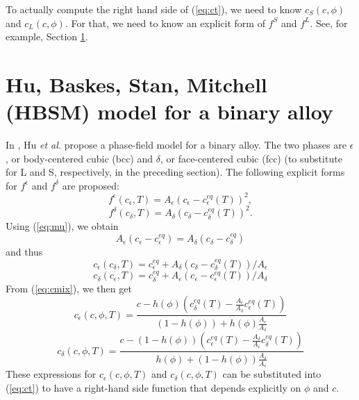 To actually compute the right hand side of (\ref{eq:ct}), we need to
know $c_S(c,\phi)$ and $c_L(c,\phi)$. For that, we need to know an
explicit form of $f^S$ and $f^L$. See, for example, Section
\ref{sec:hbsm}.

%
\section{Hu, Baskes, Stan, Mitchell (HBSM) model for a binary alloy}
\label{sec:hbsm}

In \cite{HuBaskesStanMitchell07}, Hu {\em et al.} propose a phase-field
model for a binary alloy.  The two phases are $\epsilon$, or body-centered cubic (bcc) and $\delta$, or face-centered cubic (fcc) (to
substitute for L and S, respectively, in the preceding section).  The following explicit
forms for $f^\epsilon$ and $f^\delta$ are proposed:
%
\begin{equation}
  f^\epsilon(c_\epsilon,T)=A_\epsilon\left(c_\epsilon-c_\epsilon^{eq}(T)\right)^2,
\label{eq:fepsilon}
\end{equation}
%
\begin{equation}
  f^\delta(c_\delta,T)=A_\delta\left(c_\delta-c_\delta^{eq}(T)\right)^2.
\label{eq:fdelta}
\end{equation}
%
Using (\ref{eq:mu}), we obtain
%
\begin{equation}
  A_\epsilon(c_\epsilon-c_\epsilon^{eq})=A_\delta(c_\delta-c_\delta^{eq})
\end{equation}
%
and thus
%
\begin{equation}
  c_\epsilon(c_\delta,T) =
  c_\epsilon^{eq}+A_\delta(c_\delta-c_\delta^{eq}(T))/A_\epsilon
\end{equation}
%
\begin{equation}
  c_\delta(c_\epsilon,T) =
  c_\delta^{eq}+A_\epsilon(c_\epsilon-c_\epsilon^{eq}(T))/A_\delta
\end{equation}
%
From (\ref{eq:cmix}), we then get
%
\begin{equation}
  c_\epsilon(c,\phi,T) =
  \frac{c-h(\phi)\left(c_\delta^{eq}(T)-\frac{A_\epsilon}{A_\delta}c_\epsilon^{eq}(T)\right)}
  {(1-h(\phi))+h(\phi)\frac{A_\epsilon}{A_\delta}}
\label{eq:cepsilon}
\end{equation}
%
\begin{equation}
  c_\delta(c,\phi,T) =
  \frac{c-(1-h(\phi))\left(c_\epsilon^{eq}(T)-\frac{A_\delta}{A_\epsilon}c_\delta^{eq}(T)\right)}
  {h(\phi)+(1-h(\phi))\frac{A_\delta}{A_\epsilon}}
\label{eq:cdelta}
\end{equation}
%
These expressions for $c_\epsilon(c,\phi,T)$ and $c_\delta(c,\phi,T)$
can be substituted into (\ref{eq:ct}) to have a right-hand side
function that depends explicitly on $\phi$ and $c$.

